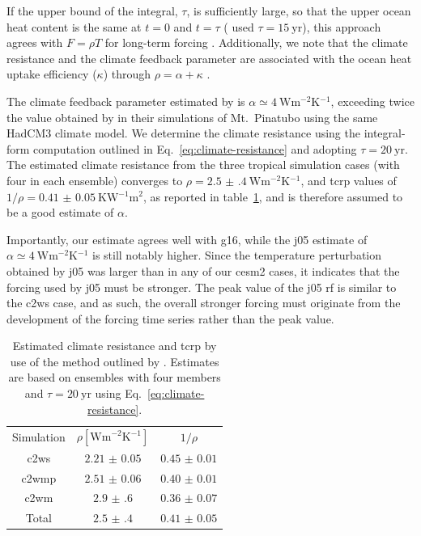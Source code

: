 \documentclass{ametsocV6.1}
\begin{document}
If the upper bound of the integral, \(\tau\), is sufficiently large, so that the upper
ocean heat content is the same at \(t=0\) and \(t=\tau\) (\citet{merlis2014} used \(\tau
=\SI{15}{\mathrm{yr}}\)), this approach agrees with \(F=\rho T\) for long-term forcing
\citep{gregory2016}. Additionally, we note that the climate resistance and the climate
feedback parameter are associated with the ocean heat uptake efficiency (\(\kappa\))
through \(\rho =\alpha +\kappa\) \citep{gregory2016}.

The climate feedback parameter estimated by \citet{jones2005} is \(\alpha \simeq
\SI{4}{\watt\metre^{-2}\kelvin^{-1}}\), exceeding twice the value obtained by
\citet{gregory2016} in their simulations of Mt.\ Pinatubo using the same HadCM3 climate
model. We determine the climate resistance using the integral-form computation outlined
in Eq.~\ref{eq:climate-resistance} and adopting \(\tau =\SI{20}{\mathrm{yr}}\). The
estimated climate resistance from the three tropical simulation cases (with four in each
ensemble) converges to \(\rho =\SI{2.5(4)}{\watt\metre^{-2}\kelvin^{-1}}\), and
\gls{tcrp} values of \(1/\rho=\SI{0.41(5)}{\kelvin\watt^{-1}\metre^{2}}\), as reported
in table~\ref{tab:trcp}, and is therefore assumed to be a good estimate of \(\alpha\).

Importantly, our estimate agrees well with \gls{g16}, while the \gls{j05} estimate of
\(\alpha \simeq \SI{4}{\watt\metre^{-2}\kelvin^{-1}}\) is still notably higher. Since
the temperature perturbation obtained by \gls{j05} was larger than in any of our
\gls{cesm2} cases, it indicates that the forcing used by \gls{j05} must be stronger. The
peak value of the \gls{j05} \gls{rf} is similar to the \gls{c2ws} case, and as such, the
overall stronger forcing must originate from the development of the forcing time series
rather than the peak value.

\begin{table}
  \centering

  \caption{Estimated climate resistance and \gls{tcrp} by use of the method outlined by
    \citet{merlis2014}. Estimates are based on ensembles with four members and \(\tau
    =\SI{20}{\mathrm{yr}}\) using Eq.~\ref{eq:climate-resistance}.}\label{tab:trcp}%
  \begin{tabular}{ccc}
    Simulation  & \(\rho [\si{\watt\metre^{-2}\kelvin^{-1}}]\) & \(1/\rho\)        \\
    \gls{c2ws}  & \(\num{2.21(5)}\)                            & \(\num{0.45(1)}\) \\
    \gls{c2wmp} & \(\num{2.51(6)}\)                            & \(\num{0.40(1)}\) \\
    \gls{c2wm}  & \(\num{2.9(6)}\)                             & \(\num{0.36(7)}\) \\
    Total       & \(\num{2.5(4)}\)                             & \(\num{0.41(5)}\) \\
  \end{tabular}
\end{table}
\end{document}
